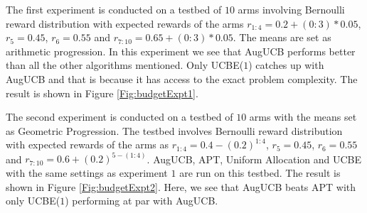 	The first experiment is conducted on a testbed of $10$ arms involving Bernoulli reward distribution with expected rewards of the arms $r_{1:4}=0.2+(0:3)*0.05$, $r_{5}=0.45$, $r_{6}=0.55$ and $r_{7:10}=0.65+(0:3)*0.05$. The means are set as arithmetic progression. In this experiment we see that AugUCB performs better than all the other algorithms mentioned. Only UCBE($1$) catches up with AugUCB and that is because it has access to the exact problem complexity. The result is shown in Figure \ref{Fig:budgetExpt1}.
	
	The second experiment is conducted on a testbed of $10$ arms with the means set as Geometric Progression. The testbed involves Bernoulli reward distribution with expected rewards of the arms as $r_{1:4}=0.4-(0.2)^{1:4}$, $r_{5}=0.45$, $r_{6}=0.55$ and $r_{7:10}=0.6+(0.2)^{5-(1:4)}$. AugUCB, APT, Uniform Allocation and UCBE with the same settings  as experiment $1$ are run on this testbed. The result is shown in Figure \ref{Fig:budgetExpt2}. Here, we see that AugUCB beats APT with only UCBE($1$) performing at par with AugUCB. 


